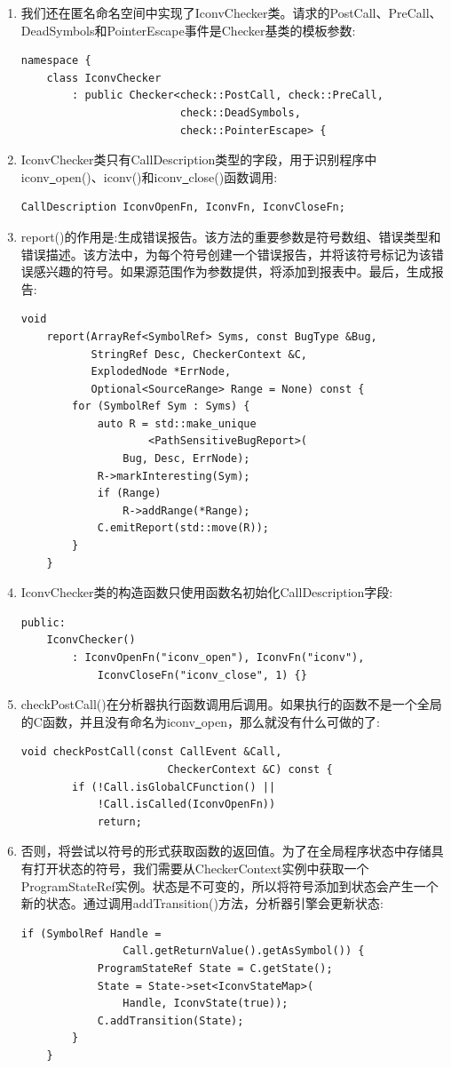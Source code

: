 \begin{enumerate}
\item 我们还在匿名命名空间中实现了IconvChecker类。请求的PostCall、PreCall、DeadSymbols和PointerEscape事件是Checker基类的模板参数:
\begin{lstlisting}[caption={}]
namespace {
	class IconvChecker
		: public Checker<check::PostCall, check::PreCall,
						 check::DeadSymbols,
						 check::PointerEscape> {
\end{lstlisting}

\item IconvChecker类只有CallDescription类型的字段，用于识别程序中iconv\underline{~}open()、iconv()和iconv\underline{~}close()函数调用:
\begin{lstlisting}[caption={}]
	CallDescription IconvOpenFn, IconvFn, IconvCloseFn;
\end{lstlisting}

\item report()的作用是:生成错误报告。该方法的重要参数是符号数组、错误类型和错误描述。该方法中，为每个符号创建一个错误报告，并将该符号标记为该错误感兴趣的符号。如果源范围作为参数提供，将添加到报表中。最后，生成报告:
\begin{lstlisting}[caption={}]
	void
	report(ArrayRef<SymbolRef> Syms, const BugType &Bug,
		   StringRef Desc, CheckerContext &C,
		   ExplodedNode *ErrNode,
		   Optional<SourceRange> Range = None) const {
		for (SymbolRef Sym : Syms) {
			auto R = std::make_unique
					<PathSensitiveBugReport>(
				Bug, Desc, ErrNode);
			R->markInteresting(Sym);
			if (Range)
				R->addRange(*Range);
			C.emitReport(std::move(R));
		}
	}
\end{lstlisting}

\item IconvChecker类的构造函数只使用函数名初始化CallDescription字段:
\begin{lstlisting}[caption={}]
public:
	IconvChecker()
		: IconvOpenFn("iconv_open"), IconvFn("iconv"),
			IconvCloseFn("iconv_close", 1) {}
\end{lstlisting}

\item checkPostCall()在分析器执行函数调用后调用。如果执行的函数不是一个全局的C函数，并且没有命名为iconv\underline{~}open，那么就没有什么可做的了:
\begin{lstlisting}[caption={}]
	void checkPostCall(const CallEvent &Call,
					   CheckerContext &C) const {
		if (!Call.isGlobalCFunction() ||
			!Call.isCalled(IconvOpenFn))
			return;
\end{lstlisting}

\item 否则，将尝试以符号的形式获取函数的返回值。为了在全局程序状态中存储具有打开状态的符号，我们需要从CheckerContext实例中获取一个ProgramStateRef实例。状态是不可变的，所以将符号添加到状态会产生一个新的状态。通过调用addTransition()方法，分析器引擎会更新状态:
\begin{lstlisting}[caption={}]
	if (SymbolRef Handle =
				Call.getReturnValue().getAsSymbol()) {
			ProgramStateRef State = C.getState();
			State = State->set<IconvStateMap>(
				Handle, IconvState(true));
			C.addTransition(State);
		}
	}
\end{lstlisting}


\end{enumerate}
